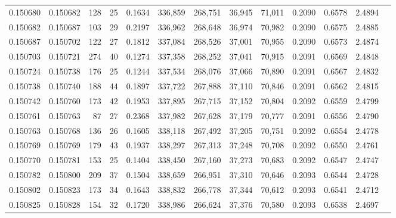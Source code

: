 \begin{tabular}{rrrrrrrrrrrrr}
0.150680 & 0.150682 &   128 &  25 &                                     0.1634 & 336,859 & 268,751 &  36,945 &  71,011 & 0.2090 & 0.6578 & 2.4894 \\
0.150682 & 0.150687 &   103 &  29 &                                     0.2197 & 336,962 & 268,648 &  36,974 &  70,982 & 0.2090 & 0.6575 & 2.4885 \\
0.150687 & 0.150702 &   122 &  27 &                                     0.1812 & 337,084 & 268,526 &  37,001 &  70,955 & 0.2090 & 0.6573 & 2.4874 \\
0.150703 & 0.150721 &   274 &  40 &                                     0.1274 & 337,358 & 268,252 &  37,041 &  70,915 & 0.2091 & 0.6569 & 2.4848 \\
0.150724 & 0.150738 &   176 &  25 &                                     0.1244 & 337,534 & 268,076 &  37,066 &  70,890 & 0.2091 & 0.6567 & 2.4832 \\
0.150738 & 0.150740 &   188 &  44 &                                     0.1897 & 337,722 & 267,888 &  37,110 &  70,846 & 0.2091 & 0.6562 & 2.4815 \\
0.150742 & 0.150760 &   173 &  42 &                                     0.1953 & 337,895 & 267,715 &  37,152 &  70,804 & 0.2092 & 0.6559 & 2.4799 \\
0.150761 & 0.150763 &    87 &  27 &                                     0.2368 & 337,982 & 267,628 &  37,179 &  70,777 & 0.2091 & 0.6556 & 2.4790 \\
0.150763 & 0.150768 &   136 &  26 &                                     0.1605 & 338,118 & 267,492 &  37,205 &  70,751 & 0.2092 & 0.6554 & 2.4778 \\
0.150769 & 0.150769 &   179 &  43 &                                     0.1937 & 338,297 & 267,313 &  37,248 &  70,708 & 0.2092 & 0.6550 & 2.4761 \\
0.150770 & 0.150781 &   153 &  25 &                                     0.1404 & 338,450 & 267,160 &  37,273 &  70,683 & 0.2092 & 0.6547 & 2.4747 \\
0.150782 & 0.150800 &   209 &  37 &                                     0.1504 & 338,659 & 266,951 &  37,310 &  70,646 & 0.2093 & 0.6544 & 2.4728 \\
0.150802 & 0.150823 &   173 &  34 &                                     0.1643 & 338,832 & 266,778 &  37,344 &  70,612 & 0.2093 & 0.6541 & 2.4712 \\
0.150825 & 0.150828 &   154 &  32 &                                     0.1720 & 338,986 & 266,624 &  37,376 &  70,580 & 0.2093 & 0.6538 & 2.4697 \\

\end{tabular}
